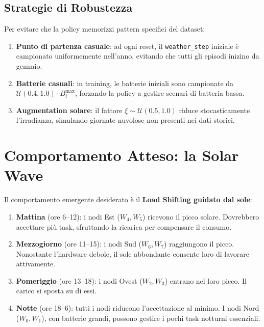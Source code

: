 \documentclass[11pt,a4paper]{article}
\begin{document}
\subsection{Strategie di Robustezza}

Per evitare che la policy memorizzi pattern specifici del dataset:

\begin{enumerate}[nosep]
    \item \textbf{Punto di partenza casuale}: ad ogni reset, il \texttt{weather\_step} iniziale \`e campionato uniformemente nell'anno, evitando che tutti gli episodi inizino da gennaio.
    \item \textbf{Batterie casuali}: in training, le batterie iniziali sono campionate da $\mathcal{U}(0.4, 1.0) \cdot B_i^{\max}$, forzando la policy a gestire scenari di batteria bassa.
    \item \textbf{Augmentation solare}: il fattore $\xi \sim \mathcal{U}(0.5, 1.0)$ riduce stocasticamente l'irradianza, simulando giornate nuvolose non presenti nei dati storici.
\end{enumerate}

\section{Comportamento Atteso: la Solar Wave}

Il comportamento emergente desiderato \`e il \textbf{Load Shifting guidato dal sole}:

\begin{enumerate}[nosep]
    \item \textbf{Mattina} (ore 6--12): i nodi Est ($W_4, W_5$) ricevono il picco solare. Dovrebbero accettare pi\`u task, sfruttando la ricarica per compensare il consumo.
    \item \textbf{Mezzogiorno} (ore 11--15): i nodi Sud ($W_6, W_7$) raggiungono il picco. Nonostante l'hardware debole, il sole abbondante consente loro di lavorare attivamente.
    \item \textbf{Pomeriggio} (ore 13--18): i nodi Ovest ($W_2, W_3$) entrano nel loro picco. Il carico si sposta su di essi.
    \item \textbf{Notte} (ore 18--6): tutti i nodi riducono l'accettazione al minimo. I nodi Nord ($W_0, W_1$), con batterie grandi, possono gestire i pochi task notturni essenziali.
\end{enumerate}
\end{document}
